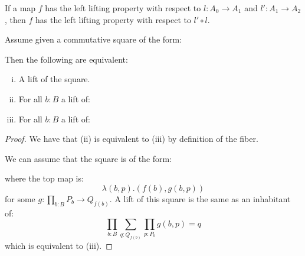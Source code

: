 \begin{lemma}%
  If a map $f$ has the left lifting property with respect to $l:A_0\to A_1$ and $l':A_1\to A_2$,
  then $f$ has the left lifting property with respect to $l'\circ l$.
\end{lemma}

\begin{lemma}
\label{lifts-equivalence-pointwise}
Assume given a commutative square of the form:
 \begin{center}
  \end{center}
Then the following are equivalent:
\begin{enumerate}[(i)]
\item A lift of the square.
\item For all $b:B$ a lift of:
 \begin{center}
  \end{center}
 \item For all $b:B$ a lift of:
  \begin{center}
  \end{center}
\end{enumerate}
\end{lemma}

\begin{proof}
We have that (ii) is equivalent to (iii) by definition of the fiber.

We can assume that the square is of the form:
 \begin{center}
  \end{center}
  where the top map is:
  \[
  \lambda (b,p). (f(b),g(b,p))
  \]
  for some $g:\prod_{b:B} P_b \to Q_{f(b)}$. A lift of this square is the same as an inhabitant of:
  \[
  \prod_{b:B} \sum_{q:Q_{f(b)}} \prod_{p:P_b} g(b,p)=q
  \]
  which is equivalent to (iii).
\end{proof}

